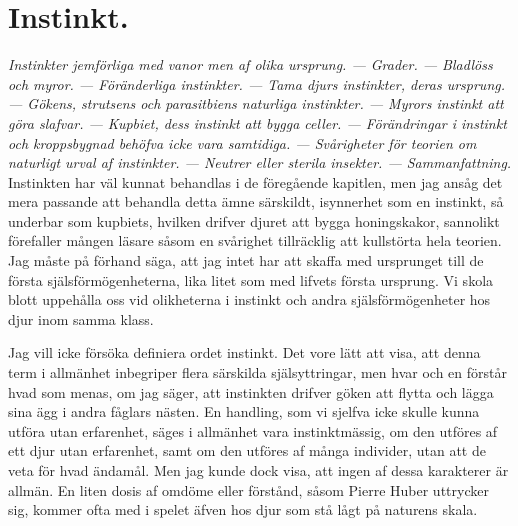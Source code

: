 




\chapter{Instinkt.}

{\it
Instinkter jemförliga med vanor men af olika ursprung. — Grader. — Bladlöss och myror. — Föränderliga instinkter. — Tama djurs instinkter, deras ursprung. — Gökens, strutsens och parasitbiens naturliga instinkter. — Myrors instinkt att göra slafvar. — Kupbiet, dess instinkt att bygga celler. — Förändringar i instinkt och kroppsbygnad behöfva icke vara samtidiga. — Svårigheter för teorien om naturligt urval af instinkter. — Neutrer eller sterila insekter. — Sammanfattning.
}\\[0.5cm]

Instinkten har väl kunnat behandlas i de föregående kapitlen, men jag ansåg det mera passande att behandla detta ämne särskildt, isynnerhet som en instinkt, så underbar som kupbiets, hvilken drifver djuret att bygga honingskakor, sannolikt förefaller mången läsare såsom en svårighet tillräcklig att kullstörta hela teorien. Jag måste på förhand säga, att jag intet har att skaffa med ursprunget till de första själsförmögenheterna, lika litet som med lifvets första ursprung. Vi skola blott uppehålla oss vid olikheterna i instinkt och andra själsförmögenheter hos djur inom samma klass.

Jag vill icke försöka definiera ordet instinkt. Det vore lätt att visa, att denna term i allmänhet inbegriper flera särskilda själsyttringar, men hvar och en förstår hvad som menas, om jag säger, att instinkten drifver göken att flytta och lägga sina ägg i andra fåglars nästen. En handling, som vi sjelfva icke skulle kunna utföra utan erfarenhet, säges i allmänhet vara instinktmässig, om den utföres af ett djur utan erfarenhet, samt om den utföres af många individer, utan att de veta för hvad ändamål. Men jag kunde dock visa, att ingen af dessa karakterer är allmän. En liten dosis af omdöme eller förstånd, såsom Pierre Huber uttrycker sig, kommer ofta med i spelet äfven hos djur som stå lågt på naturens skala.

